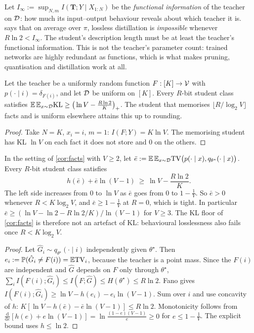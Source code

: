 \noindent
Let $I_\infty:=\sup_{N,m}I(\mathbf T;Y\mid X_{1:N})$ be the \emph{functional information} of the teacher
on $\mathcal{D}$: how much its input--output behaviour reveals about which teacher it is. 
says that on average over $\pi$, lossless distillation is \emph{impossible} whenever $R\ln2<I_\infty$. The
student's description length must be at least the teacher's functional information. This is not the
teacher's parameter count: trained networks are highly redundant as functions, which is what makes
pruning, quantisation and distillation work at all.

\begin{corollary}\label{cor:facts}
\Pv\Ck Let the teacher be a uniformly random function $F:[K]\to\mathcal{V}$ with $p(\cdot\mid i)=\delta_{F(i)}$, and let
$\mathcal{D}$ be uniform on $[K]$. Every $R$-bit student class satisfies
$\mathbb{E}\,\mathbb{E}_{x\sim\mathcal{D}}\mathrm{KL}\ge\big(\ln V-\frac{R\ln2}K\big)_+$. The student that memorises
$\lfloor R/\log_2V\rfloor$ facts and is uniform elsewhere attains this up to rounding.
\end{corollary}
\begin{proof}
Take $N=K$, $x_i=i$, $m=1$: $I(F;Y)=K\ln V$. The memorising student has KL $\ln V$ on each fact it does not
store and $0$ on the others.
\end{proof}

\begin{corollary}\label{cor:facts-tv}
\Pv In the setting of \cref{cor:facts} with $V\ge2$, let $\bar e:=\mathbb{E}\,\mathbb{E}_{x\sim\mathcal{D}}\mathrm{TV}\big(p(\cdot\mid x),q_{\theta^\star}(\cdot\mid x)\big)$.
Every $R$-bit student class satisfies
\[
h(\bar e)+\bar e\ln(V-1)\ \ge\ \ln V-\frac{R\ln2}K .
\]
The left side increases from $0$ to $\ln V$ as $\bar e$ goes from $0$ to $1-\frac1V$. So $\bar e>0$ whenever $R<K\log_2V$, and
$\bar e\ge1-\frac1V$ at $R=0$, which is tight. In particular $\bar e\ge(\ln V-\ln2-R\ln2/K)/\ln(V-1)$ for $V\ge3$. The KL
floor of \cref{cor:facts} is therefore not an artefact of KL: behavioural losslessness also fails once
$R<K\log_2V$.
\end{corollary}
\begin{proof}
Let $\hat G_i\sim q_{\theta^\star}(\cdot\mid i)$ independently given $\theta^\star$. Then
$e_i:=\mathbb{P}(\hat G_i\ne F(i))=\mathbb{E}\mathrm{TV}_i$, because the teacher is a point mass. Since the $F(i)$ are independent and
$\hat G$ depends on $F$ only through $\theta^\star$,
$\sum_iI(F(i);\hat G_i)\le I(F;\hat G)\le H(\theta^\star)\le R\ln2$. Fano gives
$I(F(i);\hat G_i)\ge\ln V-h(e_i)-e_i\ln(V-1)$. Sum over $i$ and use concavity of $h$:
$K[\ln V-h(\bar e)-\bar e\ln(V-1)]\le R\ln2$. Monotonicity follows from
$\frac{\mathrm d}{\mathrm de}[h(e)+e\ln(V-1)]=\ln\frac{(1-e)(V-1)}e\ge0$ for $e\le1-\frac1V$. The explicit bound uses $h\le\ln2$.
\end{proof}

